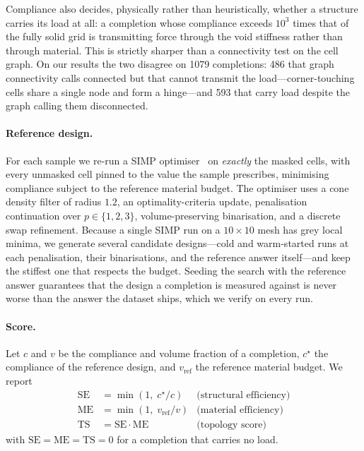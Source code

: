 Compliance also decides, physically rather than heuristically, whether a
structure carries its load at all: a completion whose compliance exceeds
$10^{3}$ times that of the fully solid grid is transmitting force through the
void stiffness rather than through material. This is strictly sharper than a
connectivity test on the cell graph. On our results the two disagree on
\num{1079} completions: \num{486} that graph connectivity calls connected but
that cannot transmit the load---corner-touching cells share a single node and
form a hinge---and \num{593} that carry load despite the graph calling them
disconnected.

\paragraph{Reference design.}
For each sample we re-run a SIMP optimiser~\cite{bendsoe2003topology} on
\emph{exactly} the masked cells, with every unmasked cell pinned to the value
the sample prescribes, minimising compliance subject to the reference material
budget. The optimiser uses a cone density filter of radius $1.2$, an
optimality-criteria update, penalisation continuation over $p \in \{1,2,3\}$,
volume-preserving binarisation, and a discrete swap refinement. Because a single
SIMP run on a $10\times10$ mesh has grey local minima, we generate several
candidate designs---cold and warm-started runs at each penalisation, their
binarisations, and the reference answer itself---and keep the stiffest one that
respects the budget. Seeding the search with the reference answer guarantees
that the design a completion is measured against is never worse than the answer
the dataset ships, which we verify on every run.

\paragraph{Score.}
Let $c$ and $v$ be the compliance and volume fraction of a completion, $c^\star$
the compliance of the reference design, and $v_{\mathrm{ref}}$ the reference
material budget. We report
\begin{align}
  \mathrm{SE} &= \min\!\left(1, \; c^\star / c\right) & \text{(structural efficiency)} \label{eq:se}\\
  \mathrm{ME} &= \min\!\left(1, \; v_{\mathrm{ref}} / v\right) & \text{(material efficiency)} \label{eq:me}\\
  \mathrm{TS} &= \mathrm{SE}\cdot\mathrm{ME} & \text{(topology score)} \label{eq:ts}
\end{align}
with $\mathrm{SE} = \mathrm{ME} = \mathrm{TS} = 0$ for a completion that carries
no load.

